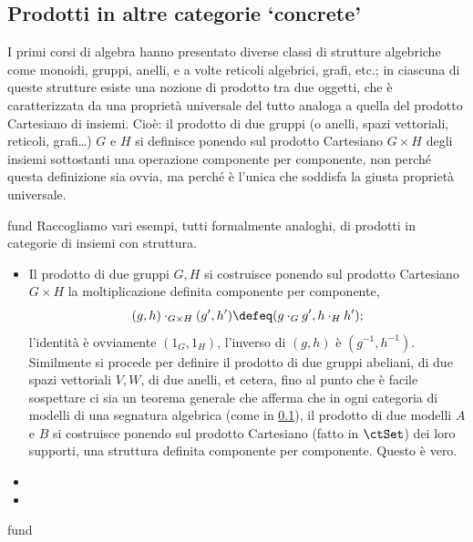 \subsection{Prodotti in altre categorie `concrete'}
I primi corsi di algebra hanno presentato diverse classi di strutture algebriche come monoidi, gruppi, anelli, e a volte reticoli algebrici, grafi, etc.; in ciascuna di queste strutture esiste una nozione di prodotto tra due oggetti, che è caratterizzata da una proprietà universale del tutto analoga a quella del prodotto Cartesiano di insiemi. Cioè: il prodotto di due gruppi (o anelli, spazi vettoriali, reticoli, grafi\dots) \(G\) e \(H\) si definisce ponendo sul prodotto Cartesiano \(G\times H\) degli insiemi sottostanti una operazione componente per componente, non perché questa definizione sia ovvia, ma perché è l'unica che soddisfa la giusta proprietà universale.
\begin{hExample}{fund}
	Raccogliamo vari esempi, tutti formalmente analoghi, di prodotti in categorie di insiemi con struttura.
	\begin{itemize}
		\item Il prodotto di due gruppi \(G,H\) si costruisce ponendo sul prodotto Cartesiano \(G\times H\) la moltiplicazione definita componente per componente,
		      \[(g,h) \cdot_{G\times H} (g',h') \defeq (g\cdot_G g', h\cdot_H h');\]
		      l'identità è ovviamente \((1_G,1_H)\), l'inverso di \((g,h)\) è \((g^{-1},h^{-1})\). Similmente si procede per definire il prodotto di due gruppi abeliani, di due spazi vettoriali \(V,W\), di due anelli, et cetera, fino al punto che è facile sospettare ci sia un teorema generale che afferma che in ogni categoria di modelli di una segnatura algebrica (come in \ref{}), il prodotto di due modelli	\(A\) e \(B\) si costruisce ponendo sul prodotto Cartesiano (fatto in \(\ctSet\)) dei loro supporti, una struttura definita componente per componente. Questo è vero.
		\item \Todo{}
		\item \Todo{}
	\end{itemize}
\end{hExample}
\begin{hExample}{fund}
\end{hExample}
